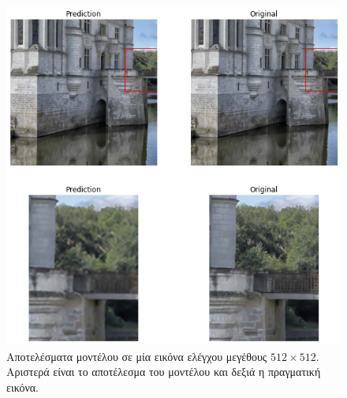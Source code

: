 \documentclass[a4paper]{article}
\begin{document}
\begin{figure}[H]
    \centering

    \includegraphics[width=.5\linewidth]{prediction_image_512.png}

    \caption{Αποτελέσματα μοντέλου σε μία εικόνα ελέγχου μεγέθους
    $512\times512$. Αριστερά είναι το αποτέλεσμα του μοντέλου και δεξιά η
    πραγματική εικόνα.}
    \label{fig:prediction_image_512}
\end{figure}



\newpage
\begin{english}
    \printbibliography[title=Βιβλιογραφία]
\end{english}
\end{document}
